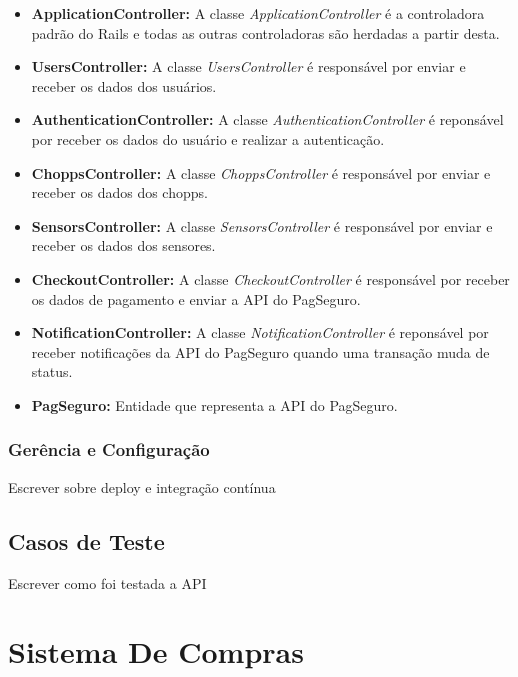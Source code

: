 \begin{itemize}
    \item \textbf{ApplicationController:} A classe \textit{ApplicationController} é a controladora padrão do Rails
    e todas as outras controladoras são herdadas a partir desta.
    \item \textbf{UsersController:} A classe \textit{UsersController} é responsável por enviar e receber os dados dos usuários.
    \item \textbf{AuthenticationController:} A classe \textit{AuthenticationController} é reponsável por receber os dados do usuário
    e realizar a autenticação.
    \item \textbf{ChoppsController:} A classe \textit{ChoppsController} é responsável por enviar e receber os dados dos chopps.
    \item \textbf{SensorsController:} A classe \textit{SensorsController} é responsável por enviar e receber os dados dos sensores.
    \item \textbf{CheckoutController:} A classe \textit{CheckoutController} é responsável por receber os dados de pagamento e enviar
    a API do PagSeguro.
    \item \textbf{NotificationController:} A classe \textit{NotificationController} é reponsável por receber notificações da API
    do PagSeguro quando uma transação muda de status.
    \item \textbf{PagSeguro:} Entidade que representa a API do PagSeguro.
\end{itemize}

\subsubsection{Gerência e Configuração}

Escrever sobre deploy e integração contínua


\subsection{Casos de Teste}

Escrever como foi testada a API


\section[Sistema De Compras]{Sistema De Compras}

